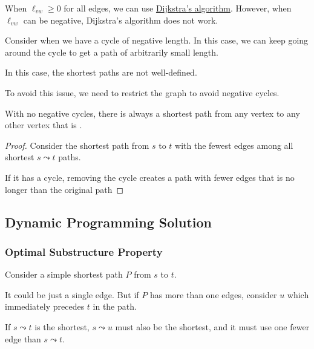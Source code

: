 When $\ell_{vw} \ge 0$ for all edges, we can use \hyperref[subsec:dijkstras-algorithm]{Dijkstra's algorithm}. However, when $\ell_{vw}$ can be negative, Dijkstra's algorithm does not work. 

\begin{example}
    Consider when we have a cycle of negative length. In this case, we can keep going around the cycle to get a path of arbitrarily small length.

    In this case, the shortest paths are not well-defined.
\end{example}

To avoid this issue, we need to restrict the graph to avoid negative cycles.

\begin{claim}
    With no negative cycles, there is always a shortest path from any vertex to any other vertex that is .
\end{claim}

\begin{proof}
    Consider the shortest path from $s$ to $t$ with the fewest edges among all shortest $s \leadsto t$ paths.

    If it has a cycle, removing the cycle creates a path with fewer edges that is no longer than the original path
\end{proof}

\subsection{Dynamic Programming Solution}

\subsubsection{Optimal Substructure Property}

Consider a simple shortest path $P$ from $s$ to $t$.

\begin{listu}
    \item It could be just a single edge. But if $P$ has more than one edges, consider $u$ which immediately precedes $t$ in the path. 
    \item If $s \leadsto t$ is the shortest, $s \leadsto u$ must also be the shortest, and it must use one fewer edge than $s \leadsto t$.
\end{listu}

